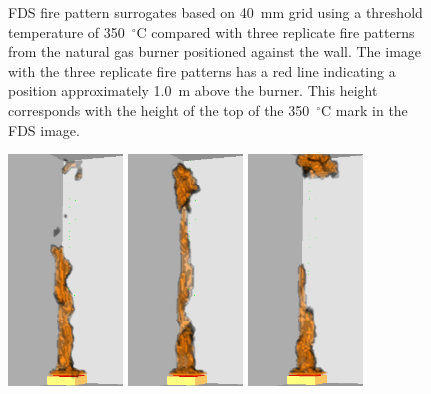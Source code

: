 \documentclass[twoside]{uocthesis}
\begin{document}
{\begin{figure}[h]
  \caption[FDS fire pattern surrogates based on 40~mm grid using a threshold temperature of 350~$^\circ$C compared with three replicate fire patterns from the natural gas burner positioned against the wall]{FDS fire pattern surrogates based on 40~mm grid using a threshold temperature of 350~$^\circ$C compared with three replicate fire patterns from the natural gas burner positioned against the wall.  The image with the three replicate fire patterns has a red line indicating a position approximately 1.0~m above the burner.  This height corresponds with the height of the top of the 350~$^\circ$C mark in the FDS image.}
  \label{FDS_FirePattern_comp}
\end{figure}


\begin{figure}[p]
	\includegraphics[width=1.2in]{../Figures/FDSNG_Corner1}
	\includegraphics[width=1.2in]{../Figures/FDSNG_Corner2}
	\includegraphics[width=1.2in]{../Figures/FDSNG_Corner3} \\


\end{figure}}
\end{document}
